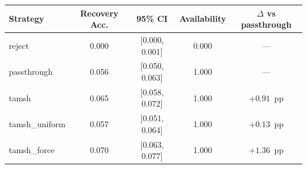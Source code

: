 \begin{tabular}{lcccc}
\toprule
Strategy        & Recovery Acc. & 95\% CI & Availability & $\Delta$ vs passthrough \\
\midrule
reject          & 0.000 & [0.000, 0.001] & 0.000 & --- \\
passthrough     & 0.056 & [0.050, 0.063] & 1.000 & --- \\
\midrule
tamsh           & 0.065 & [0.058, 0.072] & 1.000 & $+0.91$~pp \\
tamsh\_uniform  & 0.057 & [0.051, 0.064] & 1.000 & $+0.13$~pp \\
tamsh\_force    & 0.070 & [0.063, 0.077] & 1.000 & $+1.36$~pp \\
\bottomrule
\end{tabular}
